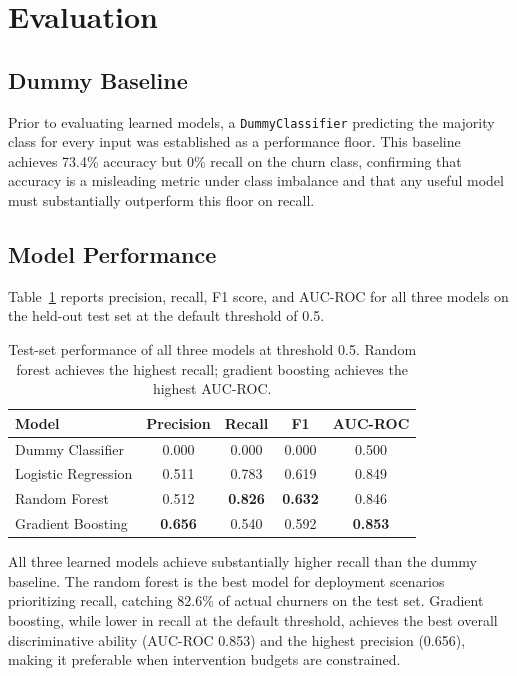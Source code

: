 \documentclass{article}
\begin{document}
\section{Evaluation}

\subsection{Dummy Baseline}

Prior to evaluating learned models, a \texttt{DummyClassifier} predicting the majority
class for every input was established as a performance floor. This baseline achieves
73.4\% accuracy but 0\% recall on the churn class, confirming that accuracy is a
misleading metric under class imbalance and that any useful model must substantially
outperform this floor on recall.

\subsection{Model Performance}

Table~\ref{tab:results} reports precision, recall, F1 score, and AUC-ROC for all
three models on the held-out test set at the default threshold of 0.5.

\begin{table}[h]
  \caption{Test-set performance of all three models at threshold 0.5.
           Random forest achieves the highest recall; gradient boosting achieves
           the highest AUC-ROC.}
  \label{tab:results}
  \centering
  \begin{tabular}{lcccc}
    \toprule
    Model & Precision & Recall & F1 & AUC-ROC \\
    \midrule
    Dummy Classifier        & 0.000 & 0.000 & 0.000 & 0.500 \\
    Logistic Regression     & 0.511 & 0.783 & 0.619 & 0.849 \\
    Random Forest           & 0.512 & \textbf{0.826} & \textbf{0.632} & 0.846 \\
    Gradient Boosting       & \textbf{0.656} & 0.540 & 0.592 & \textbf{0.853} \\
    \bottomrule
  \end{tabular}
\end{table}

All three learned models achieve substantially higher recall than the dummy baseline.
The random forest is the best model for deployment scenarios prioritizing recall,
catching 82.6\% of actual churners on the test set. Gradient boosting, while lower in
recall at the default threshold, achieves the best overall discriminative ability
(AUC-ROC 0.853) and the highest precision (0.656), making it preferable when
intervention budgets are constrained.
\end{document}
